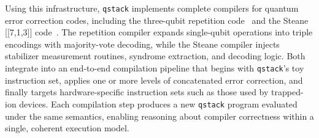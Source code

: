 Using this infrastructure, \texttt{qstack} implements complete compilers for quantum error correction codes, including the three-qubit repetition code~\cite{nielsen&chuang} and the Steane [[7,1,3]] code~\cite{steane1996error}. 
The repetition compiler expands single-qubit operations into triple encodings with majority-vote decoding, while the Steane compiler injects stabilizer measurement routines, syndrome extraction, and decoding logic. 
Both integrate into an end-to-end compilation pipeline that begins with \texttt{qstack}'s toy instruction set, applies one or more levels of concatenated error correction, and finally targets hardware-specific instruction sets such as those used by trapped-ion devices. 
Each compilation step produces a new \texttt{qstack} program evaluated under the same semantics, enabling reasoning about compiler correctness within a single, coherent execution model.


